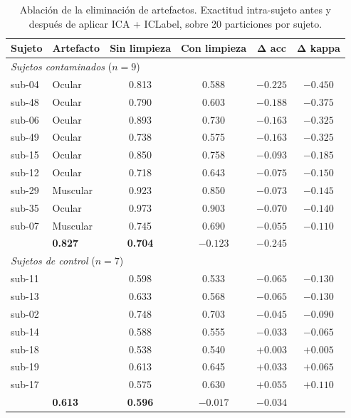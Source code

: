 \begin{table}[htbp]
\centering
\caption{Ablación de la eliminación de artefactos. Exactitud intra-sujeto antes
y después de aplicar ICA + ICLabel, sobre 20 particiones por sujeto.}
\label{tab:ablacion}
\begin{tabular}{llcccc}
\toprule
\textbf{Sujeto} & \textbf{Artefacto} & \textbf{Sin limpieza} & \textbf{Con limpieza}
  & $\boldsymbol{\Delta}$\textbf{ acc} & $\boldsymbol{\Delta}$\textbf{ kappa} \\
\midrule
\multicolumn{6}{l}{\textit{Sujetos contaminados} ($n=9$)} \\
\addlinespace[2pt]
sub-04 & Ocular   & 0.813 & 0.588 & $-0.225$ & $-0.450$ \\
sub-48 & Ocular   & 0.790 & 0.603 & $-0.188$ & $-0.375$ \\
sub-06 & Ocular   & 0.893 & 0.730 & $-0.163$ & $-0.325$ \\
sub-49 & Ocular   & 0.738 & 0.575 & $-0.163$ & $-0.325$ \\
sub-15 & Ocular   & 0.850 & 0.758 & $-0.093$ & $-0.185$ \\
sub-12 & Ocular   & 0.718 & 0.643 & $-0.075$ & $-0.150$ \\
sub-29 & Muscular & 0.923 & 0.850 & $-0.073$ & $-0.145$ \\
sub-35 & Ocular   & 0.973 & 0.903 & $-0.070$ & $-0.140$ \\
sub-07 & Muscular & 0.745 & 0.690 & $-0.055$ & $-0.110$ \\
\addlinespace[3pt]
\multicolumn{2}{l}{\textbf{Media}} & \textbf{0.827} & \textbf{0.704}
  & $\boldsymbol{-0.123}$ & $\boldsymbol{-0.245}$ \\
\midrule
\multicolumn{6}{l}{\textit{Sujetos de control} ($n=7$)} \\
\addlinespace[2pt]
sub-11 &       & 0.598 & 0.533 & $-0.065$ & $-0.130$ \\
sub-13 &       & 0.633 & 0.568 & $-0.065$ & $-0.130$ \\
sub-02 &       & 0.748 & 0.703 & $-0.045$ & $-0.090$ \\
sub-14 &       & 0.588 & 0.555 & $-0.033$ & $-0.065$ \\
sub-18 &       & 0.538 & 0.540 & $+0.003$ & $+0.005$ \\
sub-19 &       & 0.613 & 0.645 & $+0.033$ & $+0.065$ \\
sub-17 &       & 0.575 & 0.630 & $+0.055$ & $+0.110$ \\
\addlinespace[3pt]
\multicolumn{2}{l}{\textbf{Media}} & \textbf{0.613} & \textbf{0.596}
  & $\boldsymbol{-0.017}$ & $\boldsymbol{-0.034}$ \\
\bottomrule
\end{tabular}
\end{table}

